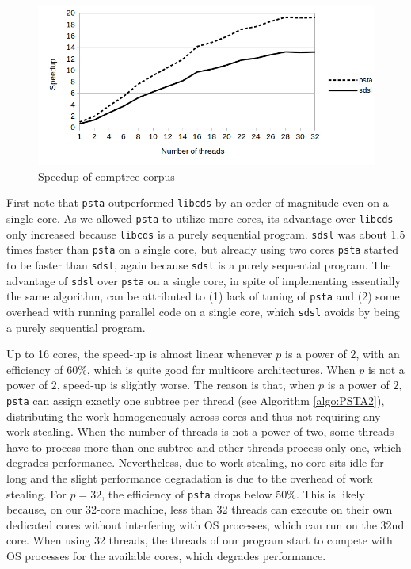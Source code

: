 \begin{figure}[ht]
  \centering
  \includegraphics[scale=0.3]{./images/Speedup.png}
  \caption{Speedup of comptree corpus}
  \label{fig:speedup}
\end{figure}

First note that {\tt psta} outperformed {\tt libcds} by an order of magnitude
even on a single core.
As we allowed {\tt psta} to utilize more cores, its advantage over
{\tt libcds} only increased because {\tt libcds} is a purely sequential
program.
{\tt sdsl} was about 1.5 times faster than {\tt psta} on a single core, but
already using two cores {\tt psta} started to be faster than {\tt sdsl}, again
because {\tt sdsl} is a purely sequential program.
The advantage of {\tt sdsl} over {\tt psta} on a single core, in spite of
implementing essentially the same algorithm, can be attributed to (1)
lack of tuning of {\tt psta} and (2) some overhead with running parallel
code on a single core, which {\tt sdsl} avoids by being a purely sequential
program.

Up to 16 cores, the speed-up is almost linear whenever $p$ is a power of $2$,
with an efficiency of 60\%, which is quite good for multicore architectures.
When $p$ is not a power of $2$, speed-up is slightly worse.
The reason is that, when $p$ is a power of $2$, {\tt psta} can assign
exactly one subtree per thread (see Algorithm \ref{algo:PSTA2}),
distributing the work homogeneously across cores and thus not requiring
any work stealing.
When the number of threads is not a power of two, some threads have to process
more than one subtree and other threads process only one, which degrades
performance.  Nevertheless, due to work stealing, no core sits idle for
long and the slight performance degradation is due to the overhead of work
stealing.
For $p = 32$, the efficiency of {\tt psta} drops below 50\%.
This is likely because, on our 32-core machine, less than 32 threads can execute
on their own dedicated cores without interfering with OS processes, which can
run on the 32nd core.
When using 32 threads, the threads of our program start to compete with OS
processes for the available cores, which degrades performance.

